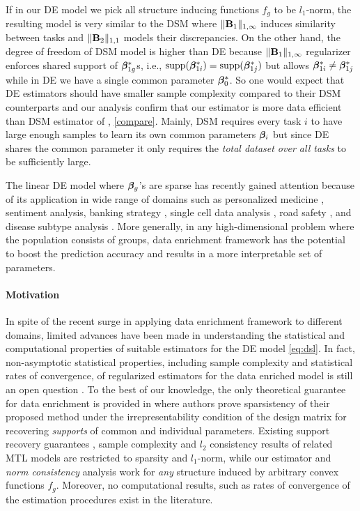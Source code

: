 If in our DE model we pick all structure inducing functions $f_g$ to be $l_1$-norm, the resulting model is very similar to the DSM where $\|\mathbf{B}_1\|_{1, \infty}$ induces similarity between tasks and $\|\mathbf{B}_2\|_{1,1}$ models their discrepancies. On the other hand, the degree of freedom of DSM model is higher than DE because $\|\mathbf{B}_1\|_{1, \infty}$ regularizer enforces shared support of $\boldsymbol{\beta}^*_{1g}$s, i.e., $\text{supp}(\boldsymbol{\beta}_{1i}^*) = \text{supp}(\boldsymbol{\beta}_{1j}^*)$ but allows $\boldsymbol{\beta}_{1i}^* \neq \boldsymbol{\beta}_{1j}^*$ while in DE we have a single common parameter $\boldsymbol{\beta}_0^*$. So one would expect that DE estimators should have smaller sample complexity compared to their DSM counterparts and our analysis confirm that our estimator is more data efficient than DSM estimator of \cite{jrsr10}, \cref{compare}. Mainly, DSM requires every task $i$ to have large enough samples to learn its own common parameters $\boldsymbol{\beta}_i$ but since DE shares the common parameter it only requires the {\em{total dataset over all tasks}} to be sufficiently large.

The linear DE model where $\boldsymbol{\beta}_g$'s are sparse has recently gained attention because of its application in wide range of domains such as personalized medicine \cite{domu16}, sentiment analysis, banking strategy \cite{grti16}, single cell data analysis \cite{olvi15}, road safety \cite{olvi14}, and disease subtype analysis \cite{domu16}.
More generally, in any high-dimensional problem where the population consists of groups, data enrichment framework has the potential to boost the prediction accuracy and results in a more interpretable set of parameters.

\paragraph{Motivation} In spite of the recent surge in applying data enrichment framework to different domains, limited advances have been made in
understanding the statistical and computational properties of suitable estimators for the DE model \cref{eq:dsl}.
In fact, non-asymptotic statistical properties, including sample complexity and statistical rates of convergence, of regularized estimators for the data enriched model is still an open question \cite{grti16, olvi14}.
To the best of our knowledge, the only theoretical guarantee for data enrichment is provided in \cite{olvi15} where authors prove sparsistency of their proposed method under the irrepresentability condition of the design matrix for recovering \emph{supports} of common and individual parameters.
Existing support recovery guarantees \cite{olvi15}, sample complexity and $l_2$ consistency results \cite{jrsr10} of related MTL models are restricted to sparsity and $l_1$-norm, while our estimator and \emph{norm consistency} analysis work for \emph{any} structure induced by arbitrary convex functions $f_g$. 
Moreover, no computational results, such as rates of convergence of the estimation procedures exist in the literature.


